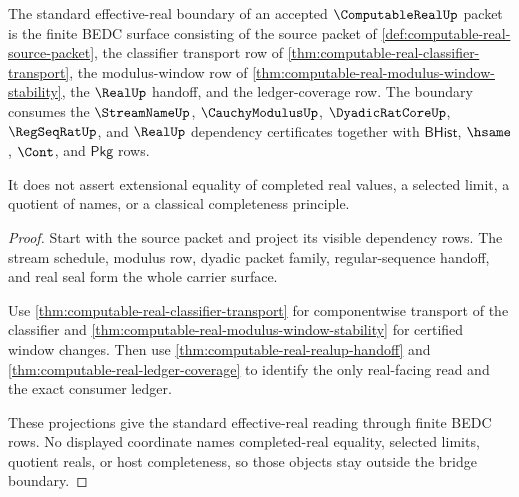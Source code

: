 \begin{theorem}
\label{thm:computable-real-bridge-boundary}
The standard effective-real boundary of an accepted $\ComputableRealUp$
packet is the finite BEDC surface consisting of the source packet of
\autoref{def:computable-real-source-packet}, the classifier transport row of
\autoref{thm:computable-real-classifier-transport}, the modulus-window row of
\autoref{thm:computable-real-modulus-window-stability}, the $\RealUp$ handoff,
and the ledger-coverage row. The boundary consumes the
$\StreamNameUp$, $\CauchyModulusUp$, $\DyadicRatCoreUp$, $\RegSeqRatUp$, and
$\RealUp$ dependency certificates together with $\mathsf{BHist}$, $\hsame$,
$\Cont$, and $\mathsf{Pkg}$ rows.

It does not assert extensional equality of completed real values, a selected
limit, a quotient of names, or a classical completeness principle.
\end{theorem}
\begin{proof}
Start with the source packet and project its visible dependency rows. The
stream schedule, modulus row, dyadic packet family, regular-sequence handoff,
and real seal form the whole carrier surface.

Use \autoref{thm:computable-real-classifier-transport} for componentwise
transport of the classifier and
\autoref{thm:computable-real-modulus-window-stability} for certified window
changes. Then use \autoref{thm:computable-real-realup-handoff} and
\autoref{thm:computable-real-ledger-coverage} to identify the only
real-facing read and the exact consumer ledger.

These projections give the standard effective-real reading through finite
BEDC rows. No displayed coordinate names completed-real equality, selected
limits, quotient reals, or host completeness, so those objects stay outside
the bridge boundary.
\end{proof}

